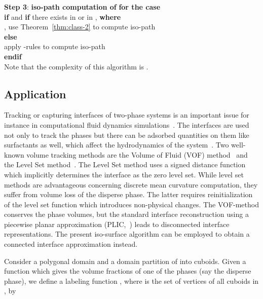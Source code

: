 \documentclass[a4paper,11pt]{article}
\begin{document}
\noindent\mbox{}\hspace{0.3cm}   {\bf Step 3}: {\bf iso-path computation of}  {\bf for the case} \\
\mbox{}\hspace{0.6cm}        {\bf if}  and {\bf if} there exists  in  or in
, {\bf where}\\
\mbox{}\hspace{1.1cm}              , use Theorem~\ref{thm:class-2} to compute iso-path\\
\mbox{}\hspace{0.6cm}        {\bf else}\\
\mbox{}\hspace{1.1cm}           apply -rules to compute iso-path \\
\mbox{}\hspace{0.6cm}        {\bf endif}\\

Note that the complexity of this algorithm is .

\subsection{Application}
Tracking or capturing interfaces of two-phase systems is an important issue for instance in computational
fluid dynamics simulations~\cite{opac-b1133222}. The interfaces are used not only to track the phases but
there can be adsorbed quantities on them like surfactants as well, which affect the hydrodynamics of the
system~\cite{Alke_and_Bothe}. Two well-known volume tracking methods are the Volume of Fluid (VOF)
method~\cite{Nich81} and the Level Set method~\cite{Stan02}. The Level Set method uses a signed distance
function which implicitly determines the interface as the zero level set. While level set methods are
advantageous concerning discrete mean curvature computation, they suffer from volume loss of the disperse phase.
The latter requires reinitialization of the level set function which introduces non-physical changes.
The VOF-method conserves the phase volumes, but the standard interface reconstruction using a piecewise
planar approximation (PLIC,~\cite{Rider97reconstructingvolume}) leads to disconnected interface representations.
The present iso-surface algorithm can be employed to obtain a connected interface approximation instead.

Consider a polygonal domain  and a domain partition
 of  into cuboids. Given a function  which gives the volume fractions of one of the phases (say the disperse phase),
we define a labeling function , where 
is the set of vertices of all cuboids in , by
\end{document}
